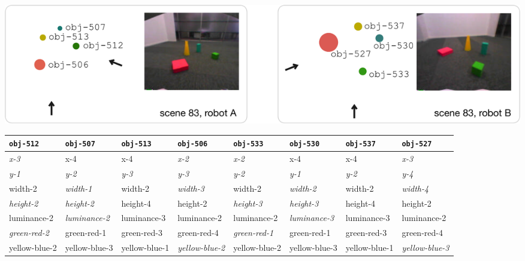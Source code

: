 
\parbox{\textwidth}{
  \renewcommand{\arraystretch}{1.3}
  \includegraphics[width=1\textwidth]{figures/qfwm-example-world-models-scene-83}
  
  \vspace{0.5cm}
  \begin{tabular*}{\textwidth}{@{}p{2.05cm}@{}p{2.05cm}@{}p{2.05cm}@{}p{2.05cm}@{}||p{2.05cm}@{}p{2.05cm}@{}p{2.05cm}@{}p{2.05cm}}
    {\tt obj-512} & {\tt obj-507} & {\tt obj-513} & {\tt obj-506} & {\tt obj-533} & {\tt obj-530} & {\tt obj-537} & {\tt obj-527} \\
    \hline
    \textcolor{dark}{\slshape x-3 } & { x-4 } & { x-4} & \textcolor{dark}{\slshape  x-2} & \textcolor{dark}{\slshape  x-2} & {  x-4} & {  x-4} & \textcolor{dark}{\slshape  x-3} \\
    \textcolor{dark}{\slshape y-1} & \textcolor{dark}{\slshape y-2} & \textcolor{dark}{\slshape y-3} & \textcolor{dark}{\slshape y-3} & \textcolor{dark}{\slshape y-2} & \textcolor{dark}{\slshape y-1} & \textcolor{dark}{\slshape y-2} & \textcolor{dark}{\slshape y-4 }\\
    { width-2} & \textcolor{dark}{\slshape width-1} & { width-2} & \textcolor{dark}{\slshape width-3} & { width-2} & \textcolor{dark}{\slshape width-2} & { width-2} & \textcolor{dark}{\slshape width-4 }\\
    \textcolor{dark}{\slshape height-2} & \textcolor{dark}{\slshape height-2} & { height-4} & { height-2} & \textcolor{dark}{\slshape height-3} & \textcolor{dark}{\slshape height-3} & { height-4} & { height-2 }\\
    { luminance-2} & \textcolor{dark}{\slshape luminance-2} & { luminance-3} & { luminance-2} & { luminance-2} & \textcolor{dark}{\slshape luminance-3} & { luminance-3} & { luminance-2 }\\
    \textcolor{dark}{\slshape green-red-2} & { green-red-1} & { green-red-3} & { green-red-4} & \textcolor{dark}{\slshape green-red-1} & { green-red-1} & { green-red-3} & { green-red-4 }\\
    { yellow-blue-2} & { yellow-blue-3} & { yellow-blue-1} & \textcolor{dark}{\slshape yellow-blue-2} & { yellow-blue-2} & { yellow-blue-3} & { yellow-blue-1} & \textcolor{dark}{\slshape yellow-blue-3}\\
    \hline
    
  \end{tabular*}
  \vspace{0.2cm}}
